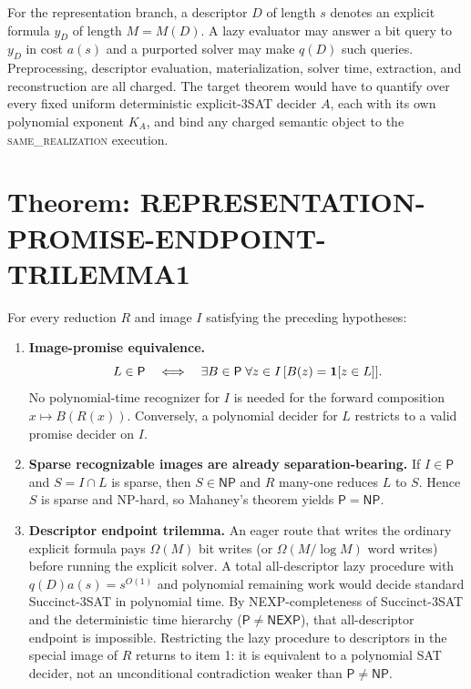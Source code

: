 \documentclass[11pt]{article}
\newcommand{\same}{\textnormal{\textsc{same\_realization}}}
\begin{document}
For the representation branch, a descriptor $D$ of length $s$ denotes an
explicit formula $y_D$ of length $M=M(D)$.  A lazy evaluator may answer a bit
query to $y_D$ in cost $a(s)$ and a purported solver may make $q(D)$ such
queries.  Preprocessing, descriptor evaluation, materialization, solver time,
extraction, and reconstruction are all charged.  The target theorem would have
to quantify over every fixed uniform deterministic explicit-3SAT decider
$A$, each with its own polynomial exponent $K_A$, and bind any charged
semantic object to the \same{} execution.

\section*{Theorem: REPRESENTATION-PROMISE-ENDPOINT-TRILEMMA1}
For every reduction $R$ and image $I$ satisfying the preceding hypotheses:

\begin{enumerate}
\item \textbf{Image-promise equivalence.}
\[
 L\in\mathsf P
 \quad\Longleftrightarrow\quad
 \exists B\in\mathsf P\;\forall z\in I\,[B(z)={\bf1}[z\in L]].
\]
No polynomial-time recognizer for $I$ is needed for the forward composition
$x\mapsto B(R(x))$.  Conversely, a polynomial decider for $L$ restricts to a
valid promise decider on $I$.

\item \textbf{Sparse recognizable images are already separation-bearing.}
If $I\in\mathsf P$ and $S=I\cap L$ is sparse, then $S\in\mathsf{NP}$ and
$R$ many-one reduces $L$ to $S$.  Hence $S$ is sparse and NP-hard, so
Mahaney's theorem yields $\mathsf P=\mathsf{NP}$.

\item \textbf{Descriptor endpoint trilemma.}  An eager route that writes the
ordinary explicit formula pays $\Omega(M)$ bit writes (or
$\Omega(M/\log M)$ word writes) before running the explicit solver.  A total
all-descriptor lazy procedure with $q(D)a(s)=s^{O(1)}$ and polynomial
remaining work would decide standard Succinct-3SAT in polynomial time.  By
NEXP-completeness of Succinct-3SAT and the deterministic time hierarchy
($\mathsf P\ne\mathsf{NEXP}$), that all-descriptor endpoint is impossible.
Restricting the lazy procedure to descriptors in the special image of $R$
returns to item 1: it is equivalent to a polynomial SAT decider, not an
unconditional contradiction weaker than $\mathsf P\ne\mathsf{NP}$.
\end{enumerate}
\end{document}
